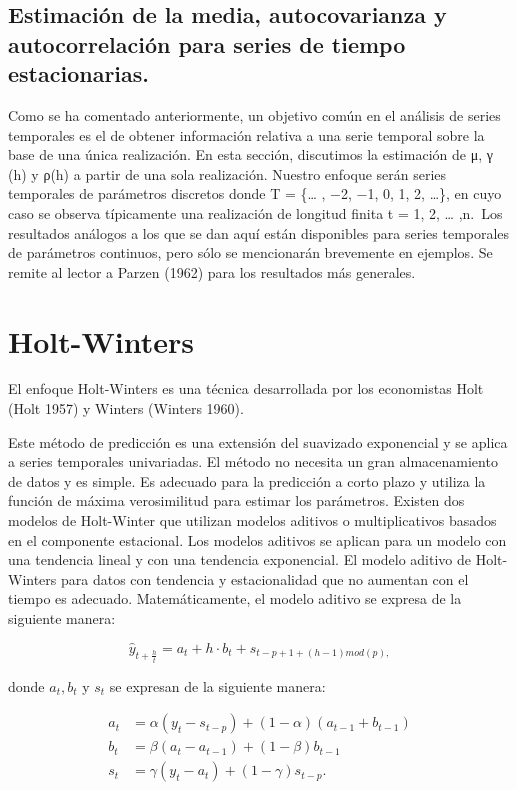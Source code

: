\documentclass[
  letterpaper,
  DIV=11,
  numbers=noendperiod]{scrreport}
\theoremstyle{plain}
\theoremstyle{definition}
\theoremstyle{definition}
\theoremstyle{plain}
\theoremstyle{remark}
\begin{document}
\subsection{Estimación de la media, autocovarianza y autocorrelación
para series de tiempo
estacionarias.}\label{estimaciuxf3n-de-la-media-autocovarianza-y-autocorrelaciuxf3n-para-series-de-tiempo-estacionarias.}

Como se ha comentado anteriormente, un objetivo común en el análisis de
series temporales es el de obtener información relativa a una serie
temporal sobre la base de una única realización. En esta sección,
discutimos la estimación de μ, γ (h) y ρ(h) a partir de una sola
realización. Nuestro enfoque serán series temporales de parámetros
discretos donde T = \{\ldots{} , −2, −1, 0, 1, 2, \ldots\}, en cuyo caso
se observa típicamente una realización de longitud finita t = 1, 2,
\ldots{} ,n.~Los resultados análogos a los que se dan aquí están
disponibles para series temporales de parámetros continuos, pero sólo se
mencionarán brevemente en ejemplos. Se remite al lector a Parzen (1962)
para los resultados más generales.

\section{Holt-Winters}\label{holt-winters}

El enfoque Holt-Winters es una técnica desarrollada por los economistas
Holt (Holt 1957) y Winters (Winters 1960).

Este método de predicción es una extensión del suavizado exponencial y
se aplica a series temporales univariadas. El método no necesita un gran
almacenamiento de datos y es simple. Es adecuado para la predicción a
corto plazo y utiliza la función de máxima verosimilitud para estimar
los parámetros. Existen dos modelos de Holt-Winter que utilizan modelos
aditivos o multiplicativos basados en el componente estacional. Los
modelos aditivos se aplican para un modelo con una tendencia lineal y
con una tendencia exponencial. El modelo aditivo de Holt-Winters para
datos con tendencia y estacionalidad que no aumentan con el tiempo es
adecuado. Matemáticamente, el modelo aditivo se expresa de la siguiente
manera:

\[ \hat{y}_{t+\frac{h}{t}}= a_t+h\cdot b_t+s_{t-p+1+(h-1)mod(p),} \]

donde \(a_t, b_t\) y \(s_t\) se expresan de la siguiente manera:

\[ \begin{split}a_t &= \alpha(y_t-s_{t-p})+(1-\alpha)(a_{t-1}+b_{t-1})\\ b_t &= \beta(a_t-a_{t-1})+(1-\beta)b_{t-1}\\ s_t &= \gamma(y_t-a_t)+(1-\gamma)s_{t-p}.\end{split} \]
\end{document}
